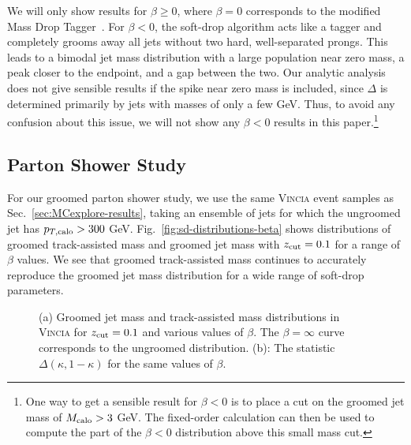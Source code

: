 \documentclass[letterpaper,11pt]{article}
\newcommand{\Fig}[1]{Fig.~\ref{#1}}
\newcommand{\Sec}[1]{Sec.~\ref{#1}}
\begin{document}
We will only show results for $\beta \ge 0$, where $\beta = 0$ corresponds to the modified Mass Drop Tagger~\cite{Dasgupta:2013ihk}.
%
For $\beta < 0$, the soft-drop algorithm acts like a tagger and completely grooms away all jets without two hard, well-separated prongs. 
%
This leads to a bimodal jet mass distribution with a large population near zero mass, a peak closer to the endpoint, and a gap between the two. 
%
Our analytic analysis does not give sensible results if the spike near zero mass is included, since $\Delta$ is determined primarily by jets with masses of only a few GeV. 
%
Thus, to avoid any confusion about this issue, we will not show any $\beta<0$ results in this paper.\footnote{One way to get a sensible result for $\beta < 0$ is to place a cut on the groomed jet mass of $M_{\rm calo} > 3$ GeV.  The fixed-order calculation can then be used to compute the part of the $\beta < 0$ distribution above this small mass cut.}




\subsection{Parton Shower Study}
\label{sec:soft-drop-parton-shower}

For our groomed parton shower study, we use the same \textsc{Vincia} event samples as \Sec{sec:MCexplore-results}, taking an ensemble of jets for which the ungroomed jet has $p_{T,\rm calo}>300$ GeV. 
%
\Fig{fig:sd-distributions-beta} shows distributions of groomed track-assisted mass and groomed jet mass with $z_{\rm cut}= 0.1$ for a range of $\beta$ values. 
%
We see that groomed track-assisted mass continues to accurately reproduce the groomed jet mass distribution for a wide range of soft-drop parameters.


\begin{figure}[t]
	\centering
	\caption{(a) Groomed jet mass and track-assisted mass distributions in \textsc{Vincia} for $z_{\rm cut} = 0.1$ and various values of $\beta$.  The $\beta = \infty$ curve corresponds to the ungroomed distribution. (b):  The statistic $\Delta(\kappa,1-\kappa)$ for the same values of $\beta$.}
	\label{fig:sd-beta}
\end{figure}
\end{document}
